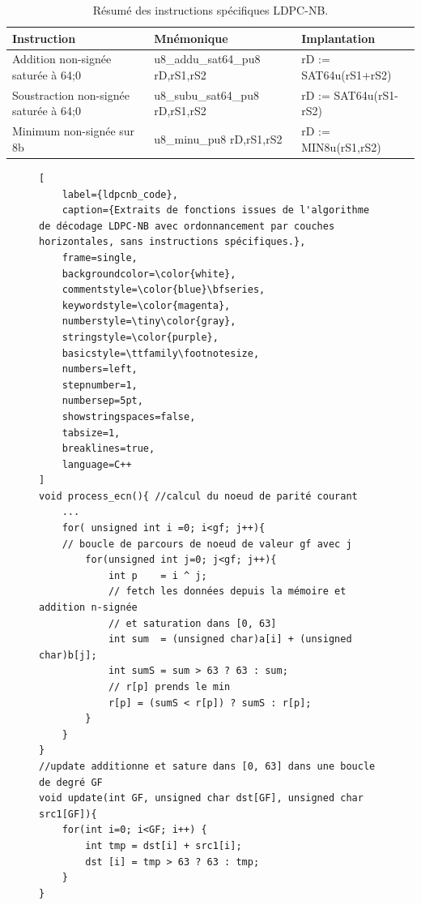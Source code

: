 \documentclass[../main.tex]{subfiles}
\begin{document}
\begin{table}[!tb]
    \footnotesize
    \centering
\begin{tabular}{ l || l l }
\hline
\textbf{Instruction}                    & \textbf{Mnémonique}       & \textbf{Implantation} \\
\hline
Addition non-signée saturée à 64;0      & u8\_addu\_sat64\_pu8  rD,rS1,rS2 & rD := SAT64u(rS1+rS2) \\ 
Soustraction non-signée saturée à 64;0  & u8\_subu\_sat64\_pu8  rD,rS1,rS2 & rD := SAT64u(rS1-rS2)  \\ 
Minimum non-signée sur 8b               & u8\_minu\_pu8         rD,rS1,rS2 & rD := MIN8u(rS1,rS2)  \\
\hline
\end{tabular}    
\caption{Résumé des instructions spécifiques LDPC-NB.}
\label{ldpcnb_instr}
\end{table}

\begin{figure}[!tb]
\begin{lstlisting}[
    label={ldpcnb_code},
    caption={Extraits de fonctions issues de l'algorithme de décodage LDPC-NB avec ordonnancement par couches horizontales, sans instructions spécifiques.},
    frame=single,
    backgroundcolor=\color{white},  
    commentstyle=\color{blue}\bfseries,
    keywordstyle=\color{magenta},
    numberstyle=\tiny\color{gray},
    stringstyle=\color{purple},
    basicstyle=\ttfamily\footnotesize,
    numbers=left,
    stepnumber=1,
    numbersep=5pt,                 
    showstringspaces=false,
    tabsize=1,
    breaklines=true,
    language=C++
]
void process_ecn(){ //calcul du noeud de parité courant 
    ...
    for( unsigned int i =0; i<gf; j++){
    // boucle de parcours de noeud de valeur gf avec j 
        for(unsigned int j=0; j<gf; j++){
            int p    = i ^ j; 
            // fetch les données depuis la mémoire et addition n-signée
            // et saturation dans [0, 63] 
            int sum  = (unsigned char)a[i] + (unsigned char)b[j];
            int sumS = sum > 63 ? 63 : sum;
            // r[p] prends le min
            r[p] = (sumS < r[p]) ? sumS : r[p];
        }
    }
}
//update additionne et sature dans [0, 63] dans une boucle de degré GF 
void update(int GF, unsigned char dst[GF], unsigned char src1[GF]){
    for(int i=0; i<GF; i++) {
        int tmp = dst[i] + src1[i];
        dst [i] = tmp > 63 ? 63 : tmp;
    }
}
\end{lstlisting}
\end{figure}
\end{document}
